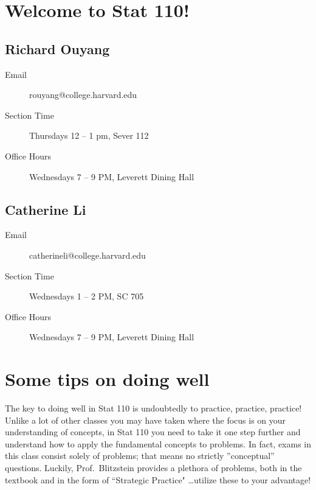 \documentclass[12pt]{article}
\begin{document}
\header

\section{Welcome to Stat 110!}

\subsection{Richard Ouyang}

\begin{description}

\item[Email] rouyang@college.harvard.edu

\item[Section Time] Thursdays 12 -- 1 pm, Sever 112

\item[Office Hours] Wednesdays 7 -- 9 PM, Leverett Dining Hall

\end{description}

\subsection{Catherine Li}

\begin{description}

\item[Email] catherineli@college.harvard.edu

\item[Section Time] Wednesdays 1 -- 2 PM, SC 705

\item[Office Hours] Wednesdays 7 -- 9 PM, Leverett Dining Hall

\end{description}

\section{Some tips on doing well}

The key to doing well in Stat 110 is undoubtedly to practice, practice, practice! Unlike a lot of other classes you may have taken where the focus is on your understanding of concepts, in Stat 110 you need to take it one step further and understand how to apply the fundamental concepts to problems. In fact, exams in
this class consist solely of problems; that means no strictly ”conceptual” questions. Luckily, Prof.~Blitzstein provides a plethora of problems, both in the textbook and in the form of ``Strategic Practice" \dots utilize these to your advantage!
\end{document}

